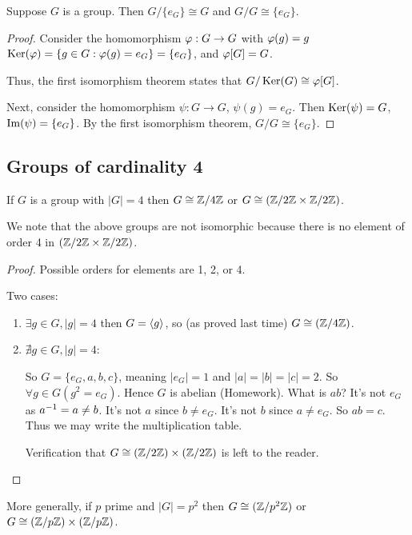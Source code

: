 \documentclass[notes.tex]{subfiles}
\begin{document}

\begin{proposition}
	Suppose $G$ is a group. Then $G/\{e_G\}\cong G$ and $G/G \cong \{e_G\}$.
\end{proposition}

\begin{proof}
	Consider the homomorphism $\varphi:G\to G$ with $\varphi(g) = g$
	$\operatorname{\mathrm{Ker}}(\varphi) = \{g\in G : \varphi(g) = e_G\} = \{e_G\}$, and $\varphi[G] = G$.

	Thus, the first isomorphism theorem states that $G/\operatorname{\mathrm{Ker}}(G)\cong \varphi[G]$.

	Next, consider the homomorphism $\psi:G\to G$, $\psi(g) = e_G$.
	Then $\operatorname{\mathrm{Ker}}(\psi) = G$, $\operatorname{\mathrm{Im}}(\psi) = \{e_G\}$. By the first isomorphism theorem, $G/G \cong \{e_G\}$.
\end{proof}

\subsection*{Groups of cardinality 4}

\begin{proposition}
	If $G$ is a group with $|G| = 4$ then $G \cong \mathbb{Z}/4\mathbb{Z}$ or $G\cong (\mathbb{Z}/2\mathbb{Z} \times \mathbb{Z}/2\mathbb{Z})$.
\end{proposition}
We note that the above groups are not isomorphic because there is no element of order 4 in $(\mathbb{Z}/2\mathbb{Z} \times \mathbb{Z}/2\mathbb{Z})$.

\begin{proof}
	Possible orders for elements are 1, 2, or 4.

	Two cases:
	\begin{enumerate}
		\item
		$\exists g \in G, |g| = 4$
		then $G = \left\langle{g}\right\rangle$, so (as proved last time) $G\cong(\mathbb{Z}/{4}\mathbb{Z})$.
		\item
		$\nexists g\in G, |g| = 4$:

		So $G = \{e_G, a, b,c \}$, meaning
		$|e_G| = 1$ and $|a| = |b| = |c| = 2$.
		So $\forall g\in G(g^2 = e_G)$. Hence $G$ is abelian (Homework).
		What is $ab$? It's not $e_G$ as ${a}^{-1} = a \ne b$.
		It's not $a$ since $b \ne e_G$. It's not $b$ since $a \ne e_G$.
		So $ab = c$.
		Thus we may write the multiplication table.

		Verification that $G\cong (\mathbb{Z}/{2}\mathbb{Z})\times(\mathbb{Z}/{2}\mathbb{Z})$ is left to the reader.
	\end{enumerate}
\end{proof}

\begin{remark}
	More generally, if $p$ prime and $|G| = p^2$ then $G\cong (\mathbb{Z}/{p^2}\mathbb{Z})$ or $G\cong (\mathbb{Z}/{p}\mathbb{Z})\times(\mathbb{Z}/{p}\mathbb{Z})$.
\end{remark}
\end{document}
